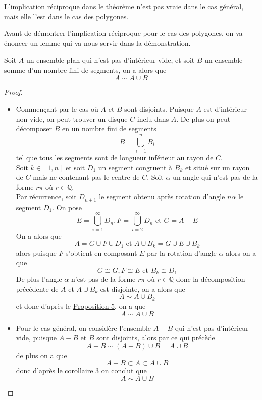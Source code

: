 \begin{rr}
  L'implication réciproque dans le théorème n'est pas vraie dans le cas général, mais elle l'est dans le cas des polygones.
\end{rr}
\noindent
Avant de démontrer l'implication réciproque pour le cas des polygones, on va énoncer un lemme qui va nous servir dans la démonstration.
\begin{lm}
Soit $A$ un ensemble plan qui n'est pas d'intérieur vide, et soit $B$ un ensemble somme d'un nombre fini de segments, on a alors que $$A \sim A \cup B$$
\end{lm}
\begin{proof}
  \hfill
  \begin{itemize}
    \item   Commençant par le cas où $A$ et $B$ sont disjoints. Puisque $A$ est d'intérieur non vide, on peut trouver un disque $C$ inclu dans $A$. De plus on peut décomposer $B$ en un nombre fini de segments $$B = \bigcup_{i=1}^n B_i$$
      tel que tous les segments sont de longueur inférieur au rayon de $C$.\\
      Soit $k \in [1,n]$ et soit $D_1$ un segment congruent à $B_k$ et situé sur un rayon de $C$ mais ne contenant pas le centre de $C$. Soit $\alpha$ un angle qui n'est pas de la forme $r\pi$ où $r\in \mathbb{Q}$.\\
      Par récurrence, soit $D_{n+1}$ le segment obtenu après rotation d'angle $n\alpha$ le segment $D_1$. On pose
      $$E = \bigcup_{i=1}^\infty D_n, F =  \bigcup_{i=2}^\infty D_n\text{ et } G = A-E$$
      On a alors que $$A = G \cup F \cup D_1 \text{ et } A \cup B_k = G \cup E \cup B_k$$
      alors puisque $F$ s'obtient en composant $E$ par la rotation d'angle $\alpha$ alors on a que $$G \cong G, F \cong E \text{ et } B_k \cong D_1$$
      De plus l'angle $\alpha$ n'est pas de la forme $r\pi$ où $r\in \mathbb{Q}$ donc la décomposition précédente de $A$ et $A \cup B_k$ est disjointe, on a alors que $$A \sim A \cup B_k$$
      et donc d'après le \hyperref[pr5]{Proposition 5}, on a que $$A \sim A \cup B$$
    \item Pour le cas général, on considère l'ensemble $A-B$ qui n'est pas d'intérieur vide, puisque $A-B$ et $B$ sont disjoints, alors par ce qui précède $$A-B \sim (A-B) \cup B = A \cup B$$
    de plus on a que $$A-B \subset A \subset A\cup B$$
    donc d'après le \hyperref[c2]{corollaire 3} on conclut que $$A \sim A \cup B$$
  \end{itemize}

\end{proof}
